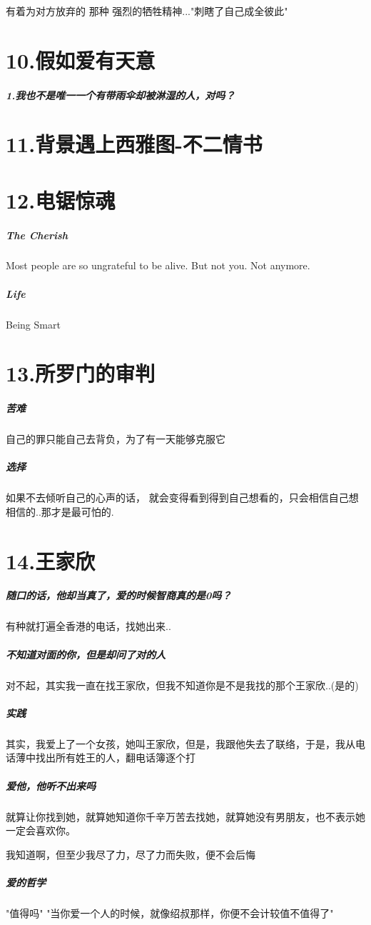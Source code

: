 \documentclass[UTF8,a4paper,8pt]{ctexbook}
\begin{document}
			有着为对方放弃的 那种 强烈的牺牲精神..."刺瞎了自己成全彼此"
			
	
	\newpage
 	\section*{10.假如爱有天意}
		\subparagraph{1.我也不是唯一一个有带雨伞却被淋湿的人，对吗？ }
		 
		
	\newpage
	\section*{11.背景遇上西雅图-不二情书}
	
	\newpage
	\section*{12.电锯惊魂}
		\subparagraph{The Cherish}Most people are so ungrateful to be alive. But not you. Not anymore.
		
		\subparagraph{Life}Being Smart
		
	\newpage
	\section*{13.所罗门的审判}
		\subparagraph{苦难}自己的罪只能自己去背负，为了有一天能够克服它	
		
		\subparagraph{选择}如果不去倾听自己的心声的话，	就会变得看到得到自己想看的，只会相信自己想相信的..那才是最可怕的.
	
	
	\newpage
	\section*{14.王家欣}
		\subparagraph{随口的话，他却当真了，爱的时候智商真的是0吗？}有种就打遍全香港的电话，找她出来..
		
		\subparagraph{不知道对面的你，但是却问了对的人}对不起，其实我一直在找王家欣，但我不知道你是不是我找的那个王家欣..(是的)
		
		\subparagraph{实践}其实，我爱上了一个女孩，她叫王家欣，但是，我跟他失去了联络，于是，我从电话薄中找出所有姓王的人，翻电话簿逐个打
		
		\subparagraph{爱他，他听不出来吗}就算让你找到她，就算她知道你千辛万苦去找她，就算她没有男朋友，也不表示她一定会喜欢你。
		
			我知道啊，但至少我尽了力，尽了力而失败，便不会后悔
			
		\subparagraph{爱的哲学}"值得吗" "当你爱一个人的时候，就像绍叔那样，你便不会计较值不值得了"
		
\end{document}
